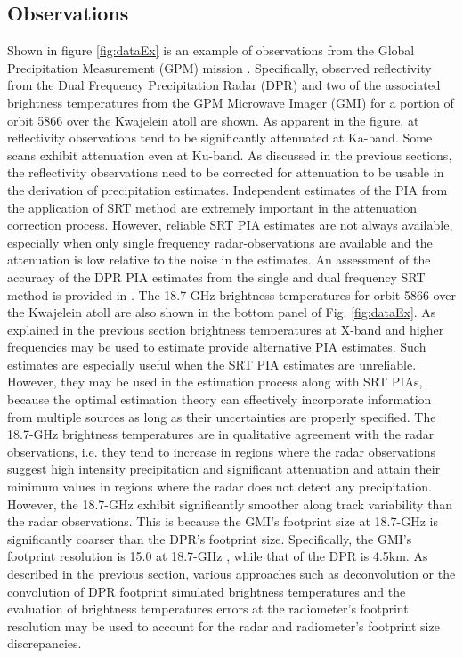 \documentclass[10pt]{ietbook}
\begin{document}
\subsection{Observations}
Shown in figure \ref{fig:dataEx} is an example of observations from the Global Precipitation Measurement (GPM) mission \cite{gail2017}.
Specifically, observed reflectivity from the Dual Frequency Precipitation Radar (DPR) and two of the associated brightness temperatures
from the GPM Microwave Imager (GMI) \cite{gail2017} for a portion of orbit 5866 over the Kwajelein atoll are shown. 
As apparent in the figure, at reflectivity observations tend to be significantly attenuated 
at Ka-band. Some scans exhibit attenuation even at Ku-band.  As discussed in the previous sections, the reflectivity observations need
to be corrected for attenuation to be usable in the derivation of precipitation estimates. Independent estimates of the PIA from the application
of SRT method are extremely important in the attenuation correction process.  However, reliable SRT PIA estimates are not always available,
especially when only single frequency radar-observations are available and the attenuation is low relative to the noise in the estimates.
An assessment of the accuracy of the DPR PIA estimates from the single and dual frequency SRT method is provided in \cite{meneghini2015}.
The 18.7-GHz brightness temperatures for orbit 5866 over the Kwajelein atoll are also shown in the bottom panel of Fig. \ref{fig:dataEx}.
As explained in the previous section brightness temperatures at X-band and higher frequencies may be used to estimate provide alternative PIA
estimates.  Such estimates are especially useful when the SRT PIA estimates are unreliable. However, they may be used in the estimation process along 
with SRT PIAs, because the optimal estimation theory can effectively incorporate information from multiple sources as long as their uncertainties are 
properly specified.  The 18.7-GHz brightness temperatures are in qualitative agreement with the radar observations, i.e. they tend to increase
in regions where the radar observations suggest high intensity precipitation and significant attenuation and attain their minimum values in regions
where the radar does not detect any precipitation.  However, the 18.7-GHz exhibit significantly smoother along track variability than the radar
observations.  This is because the GMI's footprint size at 18.7-GHz is significantly coarser than the DPR's footprint size. Specifically,
the GMI's footprint resolution is 15.0 at 18.7-GHz \cite{gmi2015}, while that of the DPR is 4.5km.  As described in the previous section,
various approaches such as deconvolution or the convolution of DPR footprint simulated brightness temperatures and the evaluation of brightness
temperatures errors at the radiometer's footprint resolution may be used to account for the radar and radiometer's footprint size discrepancies.
\end{document}
